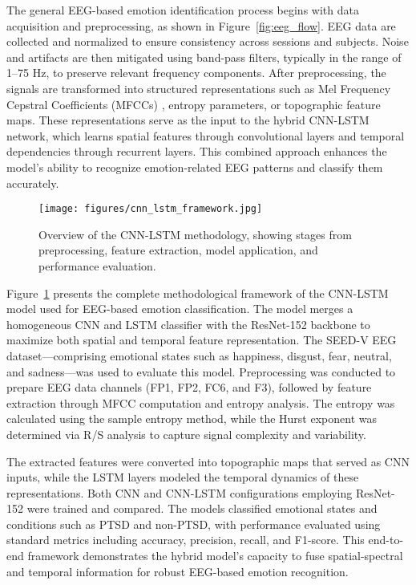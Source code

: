 \documentclass[conference]{IEEEtran}
\begin{document}
The general EEG-based emotion identification process begins with data acquisition and preprocessing, as shown in Figure~\ref{fig:eeg_flow}. EEG data are collected and normalized to ensure consistency across sessions and subjects. Noise and artifacts are then mitigated using band-pass filters, typically in the range of 1–75 Hz, to preserve relevant frequency components. After preprocessing, the signals are transformed into structured representations such as Mel Frequency Cepstral Coefficients (MFCCs) \cite{b2}, entropy parameters, or topographic feature maps. These representations serve as the input to the hybrid CNN-LSTM network, which learns spatial features through convolutional layers and temporal dependencies through recurrent layers. This combined approach enhances the model’s ability to recognize emotion-related EEG patterns and classify them accurately.

\begin{figure}[H]
    \centering
    \texttt{[image: figures/cnn\_lstm\_framework.jpg]}
    \caption{Overview of the CNN-LSTM methodology, showing stages from preprocessing, feature extraction, model application, and performance evaluation.}
    \label{fig:cnn_lstm_framework}
\end{figure}

Figure~\ref{fig:cnn_lstm_framework} presents the complete methodological framework of the CNN-LSTM model used for EEG-based emotion classification. The model merges a homogeneous CNN and LSTM classifier with the ResNet-152 backbone to maximize both spatial and temporal feature representation. The SEED-V EEG dataset—comprising emotional states such as happiness, disgust, fear, neutral, and sadness—was used to evaluate this model. Preprocessing was conducted to prepare EEG data channels (FP1, FP2, FC6, and F3), followed by feature extraction through MFCC computation and entropy analysis. The entropy was calculated using the sample entropy method, while the Hurst exponent was determined via R/S analysis to capture signal complexity and variability.

The extracted features were converted into topographic maps that served as CNN inputs, while the LSTM layers modeled the temporal dynamics of these representations. Both CNN and CNN-LSTM configurations employing ResNet-152 were trained and compared. The models classified emotional states and conditions such as PTSD and non-PTSD, with performance evaluated using standard metrics including accuracy, precision, recall, and F1-score. This end-to-end framework demonstrates the hybrid model’s capacity to fuse spatial-spectral and temporal information for robust EEG-based emotion recognition.
\end{document}
